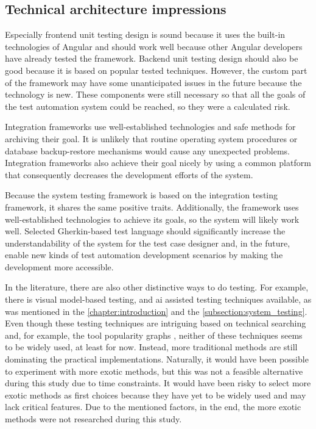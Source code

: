 \subsection{Technical architecture impressions}
Especially frontend unit testing design is sound because it uses the built-in technologies of Angular and should work well because other Angular developers have already tested the framework. Backend unit testing design should also be good because it is based on popular tested techniques. However, the custom part of the framework may have some unanticipated issues in the future because the technology is new. These components were still necessary so that all the goals of the test automation system could be reached, so they were a calculated risk.

Integration frameworks use well-established technologies and safe methods for archiving their goal. It is unlikely that routine operating system procedures or database backup-restore mechanisms would cause any unexpected problems. Integration frameworks also achieve their goal nicely by using a common platform that consequently decreases the development efforts of the system.

Because the system testing framework is based on the integration testing framework, it shares the same positive traits. Additionally, the framework uses well-established technologies to achieve its goals, so the system will likely work well. Selected Gherkin-based test language should significantly increase the understandability of the system for the test case designer and, in the future, enable new kinds of test automation development scenarios by making the development more accessible.

In the literature, there are also other distinctive ways to do testing. For example, there is visual model-based testing, and \gls{ai} assisted testing techniques available, as was mentioned in the \autoref{chapter:introduction} and the \autoref{subsection:system_testing}. Even though these testing techniques are intriguing based on technical searching and, for example, the tool popularity graphs \cite{stateofjs2021}, neither of these techniques seems to be widely used, at least for now. Instead, more traditional methods are still dominating the practical implementations. Naturally, it would have been possible to experiment with more exotic methods, but this was not a feasible alternative during this study due to time constraints. It would have been risky to select more exotic methods as first choices because they have yet to be widely used and may lack critical features. Due to the mentioned factors, in the end, the more exotic methods were not researched during this study.

